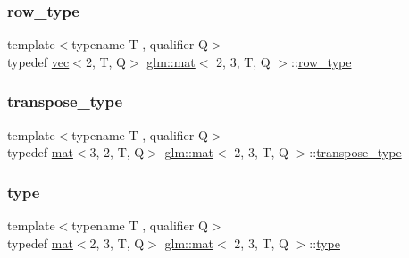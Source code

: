 \mbox{\label{structglm_1_1mat_3_012_00_013_00_01_t_00_01_q_01_4_a94cb8478500cfb7249eadf766b9e64f1}} 
\subsubsection{\texorpdfstring{row\+\_\+type}{row\_type}}
{\footnotesize\ttfamily template$<$typename T , qualifier Q$>$ \\
typedef \hyperlink{structglm_1_1vec}{vec}$<$2, T, Q$>$ \hyperlink{structglm_1_1mat}{glm\+::mat}$<$ 2, 3, T, Q $>$\+::\hyperlink{structglm_1_1mat_3_012_00_013_00_01_t_00_01_q_01_4_a94cb8478500cfb7249eadf766b9e64f1}{row\+\_\+type}}

\mbox{\label{structglm_1_1mat_3_012_00_013_00_01_t_00_01_q_01_4_a5e827ce80d430334f2815fa8eb6aeb06}} 
\subsubsection{\texorpdfstring{transpose\+\_\+type}{transpose\_type}}
{\footnotesize\ttfamily template$<$typename T , qualifier Q$>$ \\
typedef \hyperlink{structglm_1_1mat}{mat}$<$3, 2, T, Q$>$ \hyperlink{structglm_1_1mat}{glm\+::mat}$<$ 2, 3, T, Q $>$\+::\hyperlink{structglm_1_1mat_3_012_00_013_00_01_t_00_01_q_01_4_a5e827ce80d430334f2815fa8eb6aeb06}{transpose\+\_\+type}}

\mbox{\label{structglm_1_1mat_3_012_00_013_00_01_t_00_01_q_01_4_a8a283bdf36e731e243e185a5dc783070}} 
\subsubsection{\texorpdfstring{type}{type}}
{\footnotesize\ttfamily template$<$typename T , qualifier Q$>$ \\
typedef \hyperlink{structglm_1_1mat}{mat}$<$2, 3, T, Q$>$ \hyperlink{structglm_1_1mat}{glm\+::mat}$<$ 2, 3, T, Q $>$\+::\hyperlink{structglm_1_1mat_3_012_00_013_00_01_t_00_01_q_01_4_a8a283bdf36e731e243e185a5dc783070}{type}}

